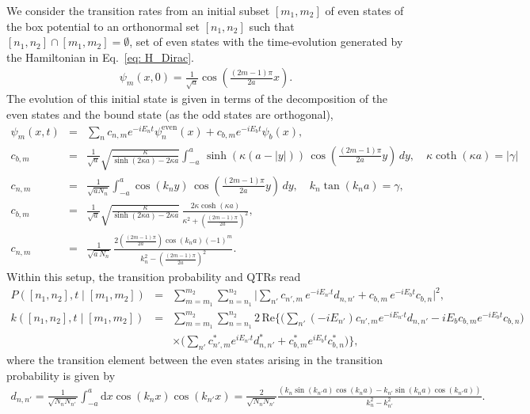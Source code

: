 \documentclass[prl,aps,amssymb,twocolumn,superscriptaddress, notitlepage, longbibliography]{revtex4-2}
\begin{document}
We consider the transition rates from an initial subset $[m_1,m_2]$ of even states of the box potential to an orthonormal set $[n_1,n_2]$ such that $[n_1,n_2]\cap[m_1,m_2]=\emptyset$, set of even states with the time-evolution generated by the Hamiltonian in Eq.~\eqref{eq: H_Dirac}.
\begin{eqnarray}
    \psi_m(x,0)=\frac{1}{\sqrt a}\cos\left(\frac{(2m-1)\pi}{2a}x\right).
\end{eqnarray}
The evolution of this initial state is given in terms of the decomposition of the even states and the bound state (as the odd states are orthogonal),
\begin{eqnarray}
    \psi_m(x,t)&=&\sum_n c_{n,m}e^{-iE_n t}\psi^\mathrm{even}_n(x)+c_{b,m}e^{-i E_bt}\psi_b(x),\\
    c_{b,m}&=&\frac{1}{\sqrt{a}}\sqrt{\frac{\kappa}{\sinh(2 \kappa a) - 2 \kappa a}}\int_{-a}^{a} \, \sinh\left(\kappa (a - |y|)\right)\,\cos\left(\frac{(2m-1)\pi}{2a} y\right)\,dy,\quad \kappa \coth(\kappa a)=|\gamma|\\
    c_{n,m}&=&\frac{1}{\sqrt{a N_n}}\int_{-a}^{a}\cos(k_ny)\,\cos\left(\frac{(2m-1)\pi}{2a} y\right)\,dy,\quad k_n\tan(k_n a)=\gamma,\\
    c_{b,m}
&=&
\frac{1}{\sqrt{a}}
\sqrt{\frac{\kappa}{\sinh(2\kappa a)-2\kappa a}}\,
\frac{2\kappa\cosh(\kappa a)}{\kappa^2+\left(\frac{(2m-1)\pi}{2a}\right)^2},\\
c_{n,m}
&=&
\frac{1}{\sqrt{a\,N_n}}\,
\frac{2\left(\frac{(2m-1)\pi}{2a}\right)\cos(k_n a)(-1)^{m}}
{k_n^2-\left(\frac{(2m-1)\pi}{2a}\right)^2}.
\end{eqnarray}
Within this setup, the transition probability and QTRs read
\begin{eqnarray}
P([n_1,n_2],t \mid [m_1,m_2]) &=&
\sum_{m=m_1}^{m_2} \sum_{n=n_1}^{n_2}
\Bigg|
\sum_{n'} c_{n',m} \, e^{-i E_{n'} t} d_{n,n'} + c_{b,m} \, e^{-i E_b t} c_{b,n}
\Bigg|^2,\\
k([n_1,n_2],t \mid [m_1,m_2]) &=&
\sum_{m=m_1}^{m_2} \sum_{n=n_1}^{n_2} 2 \, \mathrm{Re} \Bigg\{
\Bigg( \sum_{n'} (-i E_{n'}) c_{n',m} e^{-i E_{n'} t} d_{n,n'} - i E_b c_{b,m} e^{-i E_b t} c_{b,n} \Bigg) \nonumber\\
&&\times \Bigg( \sum_{n'} c_{n',m}^* e^{i E_{n'} t} d_{n,n'}^* + c_{b,m}^* e^{i E_b t} c_{b,n}^* \Bigg) \Bigg\},
\end{eqnarray}
where the transition element between the even states arising in the transition probability is given by
\begin{eqnarray}
d_{n,n'}=\frac{1}{\sqrt{N_nN_{n'}}}\int_{-a}^a\mathrm dx\cos(k_nx)\cos(k_{n'}x)=\frac{2}{\sqrt{N_nN_{n'}}}\frac{\left(k_n\sin(k_{n'}a)\cos(k_na)-k_{n'}\sin(k_na)\cos(k_{n'}a)\right)}{k^2_n-k^2_{n'}}.
\end{eqnarray}
\end{document}
